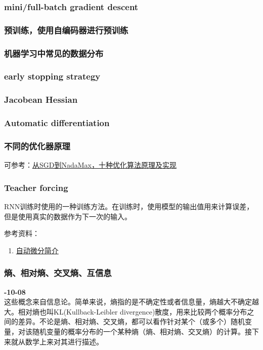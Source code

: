 \subsubsection{mini/full-batch gradient descent}


\subsubsection{预训练，使用自编码器进行预训练}

\subsubsection{机器学习中常见的数据分布}

\subsubsection{early stopping strategy}

\subsubsection{Jacobean Hessian}


\subsubsection{Automatic differentiation} 

\subsubsection{不同的优化器原理}
可参考：\href{https://mp.weixin.qq.com/s/L9jCK5rtyq3fJZEBpLvagg}{从SGD到NadaMax，十种优化算法原理及实现}


\subsubsection{Teacher forcing}     
RNN训练时使用的一种训练方法。在训练时，使用模型的输出值用来计算误差，但是使用真实的数据作为下一次的输入。

参考资料：
\begin{enumerate}
    \item \href{https://blog.csdn.net/aws3217150/article/details/70214422}{自动微分简介}
\end{enumerate}


\subsubsection{熵、相对熵、交叉熵、互信息} 
\textbf{-10-08}\\
这些概念来自信息论\cite{6773024}。简单来说，熵指的是不确定性或者信息量，熵越大不确定越大。相对熵也叫KL(Kullback-Leibler divergence)散度，用来比较两个概率分布之间的差异。不论是熵、相对熵、交叉熵，都可以看作针对某个（或多个）随机变量，对该随机变量的概率分布的一个某种熵（熵、相对熵、交叉熵）的计算。接下来就从数学上来对其进行描述。

